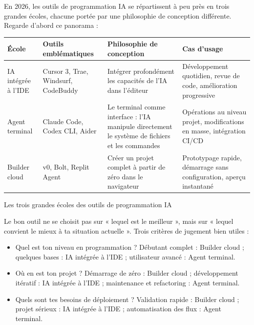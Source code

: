 


En 2026, les outils de programmation IA se répartissent à peu près en trois grandes écoles, chacune portée par une philosophie de conception différente. Regarde d'abord ce panorama :

\begin{center}
\begin{tabularx}{\linewidth}{|X|X|X|X|}
\hline
\textbf{École} & \textbf{Outils emblématiques} & \textbf{Philosophie de conception} & \textbf{Cas d'usage} \tabularnewline
\hline
IA intégrée à l'IDE & Cursor 3, Trae, Windsurf, CodeBuddy & Intégrer profondément les capacités de l'IA dans l'éditeur & Développement quotidien, revue de code, amélioration progressive \tabularnewline
Agent terminal & Claude Code, Codex CLI, Aider & Le terminal comme interface : l'IA manipule directement le système de fichiers et les commandes & Opérations au niveau projet, modifications en masse, intégration CI/CD \tabularnewline
Builder cloud & v0, Bolt, Replit Agent & Créer un projet complet à partir de zéro dans le navigateur & Prototypage rapide, démarrage sans configuration, aperçu instantané \tabularnewline
\hline
\end{tabularx}
\end{center}

\begin{center}\small\color{gray}Les trois grandes écoles des outils de programmation IA\end{center}

Le bon outil ne se choisit pas sur « lequel est le meilleur », mais sur « lequel convient le mieux à ta situation actuelle ». Trois critères de jugement bien utiles :

\begin{itemize}
  \item Quel est ton niveau en programmation ? Débutant complet : Builder cloud ; quelques bases : IA intégrée à l'IDE ; utilisateur avancé : Agent terminal.
  \item Où en est ton projet ? Démarrage de zéro : Builder cloud ; développement itératif : IA intégrée à l'IDE ; maintenance et refactoring : Agent terminal.
  \item Quels sont tes besoins de déploiement ? Validation rapide : Builder cloud ; projet sérieux : IA intégrée à l'IDE ; automatisation des flux : Agent terminal.
\end{itemize}

